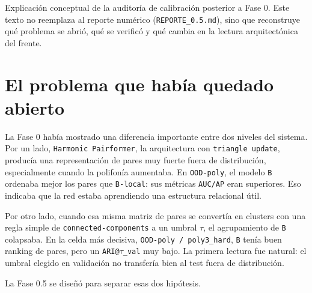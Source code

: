 \documentclass[11pt]{article}
\begin{document}

\begin{quietbox}
Explicación conceptual de la auditoría de calibración posterior a Fase 0. Este texto no reemplaza al reporte numérico (\texttt{REPORTE\_0.5.md}), sino que reconstruye qué problema se abrió, qué se verificó y qué cambia en la lectura arquitectónica del frente.
\end{quietbox}

\section{El problema que había quedado abierto}

La Fase 0 había mostrado una diferencia importante entre dos niveles del sistema. Por un lado, \texttt{Harmonic Pairformer}, la arquitectura con \texttt{triangle update}, producía una representación de pares muy fuerte fuera de distribución, especialmente cuando la polifonía aumentaba. En \texttt{OOD-poly}, el modelo \texttt{B} ordenaba mejor los pares que \texttt{B-local}: sus métricas \texttt{AUC/AP} eran superiores. Eso indicaba que la red estaba aprendiendo una estructura relacional útil.

Por otro lado, cuando esa misma matriz de pares se convertía en clusters con una regla simple de \texttt{connected-components} a un umbral $\tau$, el agrupamiento de \texttt{B} colapsaba. En la celda más decisiva, \texttt{OOD-poly / poly3\_hard}, \texttt{B} tenía buen ranking de pares, pero un \texttt{ARI@}$\tau$\texttt{\_val} muy bajo. La primera lectura fue natural: el umbral elegido en validación no transfería bien al test fuera de distribución.

La Fase 0.5 se diseñó para separar esas dos hipótesis.
\end{document}
